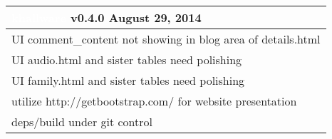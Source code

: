 \documentclass[notitlepage]{article}
\newcommand{\releasedate}{August 29, 2014}
\begin{document}
\begin{center}
\begin{tabular}{ | l | }
\hline
\LARGE\cellcolor{myblue}\textcolor{white}{khallware} v0.4.0 \releasedate{} \\
\hline
UI comment\_content not showing in blog area of details.html \\
\hline
UI audio.html and sister tables need polishing \\
\hline
UI family.html and sister tables need polishing \\
\hline
utilize http://getbootstrap.com/ for website presentation \\
\hline
deps/build under git control \\
\hline

\end{tabular}
\end{center}
\end{document}
